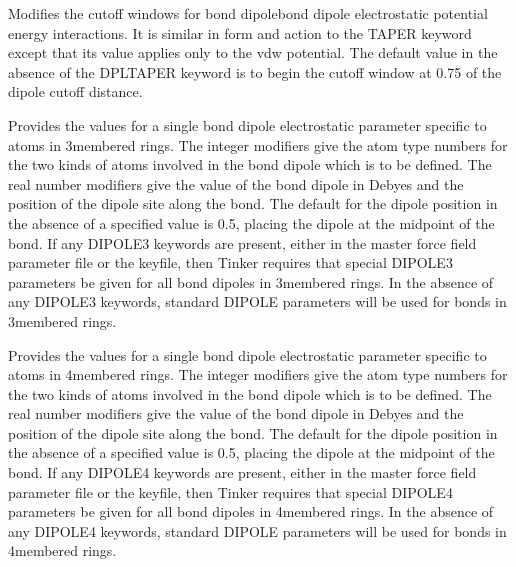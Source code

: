 \documentclass[letterpaper,11pt,english]{sphinxmanual}
\begin{document}
\ignorespaces {}\label{\detokenize{text/keywords:key-dipole-taper}}\begin{description}
\sphinxAtStartPar
Modifies the cutoff windows for bond dipole\sphinxhyphen{}bond dipole electrostatic potential energy interactions. It is similar in form and action to the TAPER keyword except that its value applies only to the vdw potential. The default value in the absence of the DPL\sphinxhyphen{}TAPER keyword is to begin the cutoff window at 0.75 of the dipole cutoff distance.

\end{description}

\ignorespaces {}\label{\detokenize{text/keywords:key-dipole3}}\begin{description}
\sphinxAtStartPar
Provides the values for a single bond dipole electrostatic parameter specific to atoms in 3\sphinxhyphen{}membered rings. The integer modifiers give the atom type numbers for the two kinds of atoms involved in the bond dipole which is to be defined. The real number modifiers give the value of the bond dipole in Debyes and the position of the dipole site along the bond. The default for the dipole position in the absence of a specified value is 0.5, placing the dipole at the midpoint of the bond. If any DIPOLE3 keywords are present, either in the master force field parameter file or the keyfile, then Tinker requires that special DIPOLE3 parameters be given for all bond dipoles in 3\sphinxhyphen{}membered rings. In the absence of any DIPOLE3 keywords, standard DIPOLE parameters will be used for bonds in 3\sphinxhyphen{}membered rings.

\end{description}

\ignorespaces {}\label{\detokenize{text/keywords:key-dipole4}}\begin{description}
\sphinxAtStartPar
Provides the values for a single bond dipole electrostatic parameter specific to atoms in 4\sphinxhyphen{}membered rings. The integer modifiers give the atom type numbers for the two kinds of atoms involved in the bond dipole which is to be defined. The real number modifiers give the value of the bond dipole in Debyes and the position of the dipole site along the bond. The default for the dipole position in the absence of a specified value is 0.5, placing the dipole at the midpoint of the bond. If any DIPOLE4 keywords are present, either in the master force field parameter file or the keyfile, then Tinker requires that special DIPOLE4 parameters be given for all bond dipoles in 4\sphinxhyphen{}membered rings. In the absence of any DIPOLE4 keywords, standard DIPOLE parameters will be used for bonds in 4\sphinxhyphen{}membered rings.

\end{description}
\end{document}
